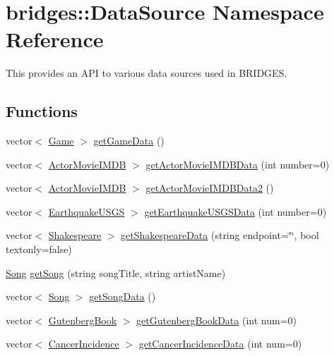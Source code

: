 \hypertarget{namespacebridges_1_1_data_source}{}\section{bridges\+:\+:Data\+Source Namespace Reference}
\label{namespacebridges_1_1_data_source}


This provides an A\+P\+I to various data sources used in B\+R\+I\+D\+G\+E\+S.  


\subsection*{Functions}
\begin{DoxyCompactItemize}
\item 
vector$<$ \hyperlink{classbridges_1_1_game}{Game} $>$ \hyperlink{namespacebridges_1_1_data_source_a96a28cc7f2a6013fe09b07cc53c7432f}{get\+Game\+Data} ()
\item 
vector$<$ \hyperlink{classbridges_1_1_actor_movie_i_m_d_b}{Actor\+Movie\+I\+M\+D\+B} $>$ \hyperlink{namespacebridges_1_1_data_source_ac43ccd8f2a325cf2f057a5ee7f0b73f1}{get\+Actor\+Movie\+I\+M\+D\+B\+Data} (int number=0)
\item 
vector$<$ \hyperlink{classbridges_1_1_actor_movie_i_m_d_b}{Actor\+Movie\+I\+M\+D\+B} $>$ \hyperlink{namespacebridges_1_1_data_source_a022113cbb28042171d088250e85098d0}{get\+Actor\+Movie\+I\+M\+D\+B\+Data2} ()
\item 
vector$<$ \hyperlink{classbridges_1_1_earthquake_u_s_g_s}{Earthquake\+U\+S\+G\+S} $>$ \hyperlink{namespacebridges_1_1_data_source_ae9f6a40dae8b8a15ebe43aca34931b43}{get\+Earthquake\+U\+S\+G\+S\+Data} (int number=0)
\item 
vector$<$ \hyperlink{classbridges_1_1_shakespeare}{Shakespeare} $>$ \hyperlink{namespacebridges_1_1_data_source_a2aa0d50a0b7bf8cc47c4f92dd1986dc6}{get\+Shakespeare\+Data} (string endpoint=\char`\"{}\char`\"{}, bool textonly=false)
\item 
\hyperlink{classbridges_1_1_song}{Song} \hyperlink{namespacebridges_1_1_data_source_a284c9d572415b67df6989ab8ab97d0e2}{get\+Song} (string song\+Title, string artist\+Name)
\item 
vector$<$ \hyperlink{classbridges_1_1_song}{Song} $>$ \hyperlink{namespacebridges_1_1_data_source_a325b6f25041e833bc2fd561bd2c2ee6e}{get\+Song\+Data} ()
\item 
vector$<$ \hyperlink{classbridges_1_1_gutenberg_book}{Gutenberg\+Book} $>$ \hyperlink{namespacebridges_1_1_data_source_a8146b00565286727e8206e377d9ff5bd}{get\+Gutenberg\+Book\+Data} (int num=0)
\item 
vector$<$ \hyperlink{classbridges_1_1_cancer_incidence}{Cancer\+Incidence} $>$ \hyperlink{namespacebridges_1_1_data_source_a4f8990ea0e793a6464d95cb82f57c8f9}{get\+Cancer\+Incidence\+Data} (int num=0)
\end{DoxyCompactItemize}


